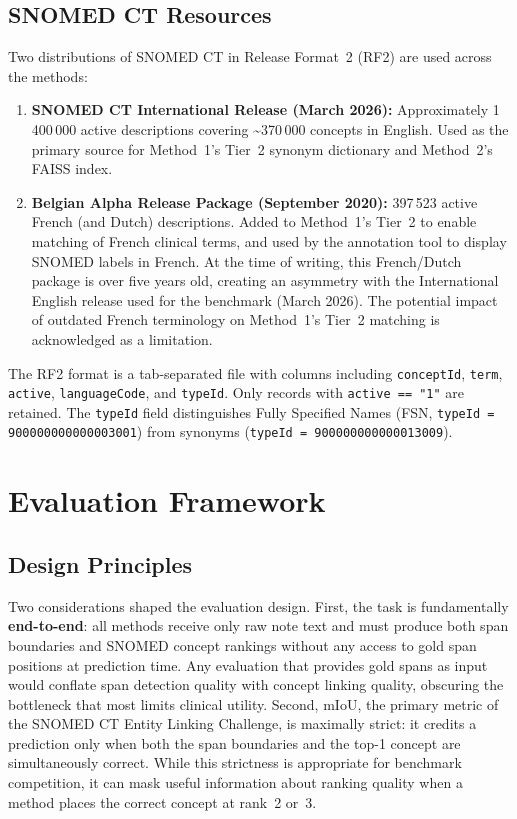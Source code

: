 \subsection{SNOMED CT Resources}

Two distributions of SNOMED CT in Release Format~2 (RF2) are used across the methods:

\begin{enumerate}
    \item \textbf{SNOMED CT International Release (March 2026):} Approximately 1\,400\,000 active descriptions covering \textasciitilde370\,000 concepts in English. Used as the primary source for Method~1's Tier~2 synonym dictionary and Method~2's FAISS index.
    \item \textbf{Belgian Alpha Release Package (September 2020):} 397\,523 active French (and Dutch) descriptions. Added to Method~1's Tier~2 to enable matching of French clinical terms, and used by the annotation tool to display SNOMED labels in French. At the time of writing, this French/Dutch package is over five years old, creating an asymmetry with the International English release used for the benchmark (March 2026). The potential impact of outdated French terminology on Method~1's Tier~2 matching is acknowledged as a limitation.
\end{enumerate}

The RF2 format is a tab-separated file with columns including \texttt{conceptId}, \texttt{term}, \texttt{active}, \texttt{languageCode}, and \texttt{typeId}. Only records with \texttt{active == "1"} are retained. The \texttt{typeId} field distinguishes Fully Specified Names (FSN, \texttt{typeId = 900000000000003001}) from synonyms (\texttt{typeId = 900000000000013009}).

\section{Evaluation Framework}

\subsection{Design Principles}

Two considerations shaped the evaluation design. First, the task is fundamentally \textbf{end-to-end}: all methods receive only raw note text and must produce both span boundaries and SNOMED concept rankings without any access to gold span positions at prediction time. Any evaluation that provides gold spans as input would conflate span detection quality with concept linking quality, obscuring the bottleneck that most limits clinical utility. Second, mIoU, the primary metric of the SNOMED CT Entity Linking Challenge, is maximally strict: it credits a prediction only when both the span boundaries and the top-1 concept are simultaneously correct. While this strictness is appropriate for benchmark competition, it can mask useful information about ranking quality when a method places the correct concept at rank~2 or~3.


